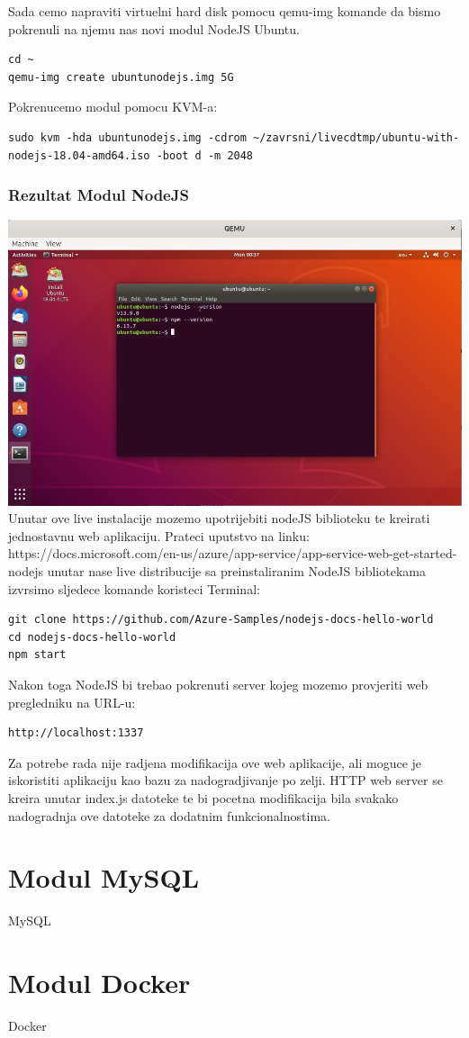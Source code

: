 \documentclass[12pt,vi]{mitthesis}
\begin{document}
\noindent
Sada cemo napraviti virtuelni hard disk pomocu qemu-img komande da bismo pokrenuli na njemu nas novi modul NodeJS Ubuntu.
\begin{lstlisting}[style=BashInputStyle]
cd ~
qemu-img create ubuntunodejs.img 5G
\end{lstlisting}

\noindent 
Pokrenucemo modul pomocu KVM-a:
\begin{lstlisting}[style=BashInputStyle]
sudo kvm -hda ubuntunodejs.img -cdrom ~/zavrsni/livecdtmp/ubuntu-with-nodejs-18.04-amd64.iso -boot d -m 2048
\end{lstlisting}

\subsection*{Rezultat Modul NodeJS}
\includegraphics[width=\linewidth]{images/ModulNodeJSUbuntu.png} 
Unutar ove live instalacije mozemo upotrijebiti nodeJS biblioteku te kreirati jednostavnu web aplikaciju. 
Prateci uputstvo na linku:
https://docs.microsoft.com/en-us/azure/app-service/app-service-web-get-started-nodejs
unutar nase live distribucije sa preinstaliranim NodeJS bibliotekama izvrsimo sljedece komande koristeci Terminal:
\begin{lstlisting}[style=BashInputStyle]
git clone https://github.com/Azure-Samples/nodejs-docs-hello-world
cd nodejs-docs-hello-world
npm start
\end{lstlisting}
Nakon toga NodeJS bi trebao pokrenuti server kojeg mozemo provjeriti web pregledniku na URL-u:
\begin{lstlisting}[style=BashInputStyle]
http://localhost:1337
\end{lstlisting}
Za potrebe rada nije radjena modifikacija ove web aplikacije, ali moguce je iskoristiti aplikaciju kao bazu za nadogradjivanje po zelji. HTTP web server se kreira unutar index.js datoteke te bi pocetna modifikacija bila svakako nadogradnja ove datoteke za dodatnim funkcionalnostima.

\chapter*{Modul MySQL}


MySQL
\chapter*{Modul Docker}

Docker
\end{document}
